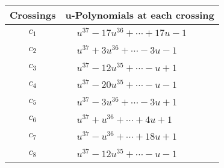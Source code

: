 \documentclass[1p]{elsarticle_modified}
\theoremstyle{definition}
\begin{document}
\begin{tabular}{m{50pt}|m{274pt}}
Crossings & \hspace{64pt}u-Polynomials at each crossing \\
\hline $$\begin{aligned}c_{1}\end{aligned}$$&$\begin{aligned}
&u^{37}-17 u^{36}+\cdots+17 u-1
\end{aligned}$\\
\hline $$\begin{aligned}c_{2}\end{aligned}$$&$\begin{aligned}
&u^{37}+3 u^{36}+\cdots-3 u-1
\end{aligned}$\\
\hline $$\begin{aligned}c_{3}\end{aligned}$$&$\begin{aligned}
&u^{37}-12 u^{35}+\cdots- u+1
\end{aligned}$\\
\hline $$\begin{aligned}c_{4}\end{aligned}$$&$\begin{aligned}
&u^{37}-20 u^{35}+\cdots- u-1
\end{aligned}$\\
\hline $$\begin{aligned}c_{5}\end{aligned}$$&$\begin{aligned}
&u^{37}-3 u^{36}+\cdots-3 u+1
\end{aligned}$\\
\hline $$\begin{aligned}c_{6}\end{aligned}$$&$\begin{aligned}
&u^{37}+u^{36}+\cdots+4 u+1
\end{aligned}$\\
\hline $$\begin{aligned}c_{7}\end{aligned}$$&$\begin{aligned}
&u^{37}- u^{36}+\cdots+18 u+1
\end{aligned}$\\
\hline $$\begin{aligned}c_{8}\end{aligned}$$&$\begin{aligned}
&u^{37}-12 u^{35}+\cdots- u-1
\end{aligned}$\\

\end{tabular}
\end{document}
